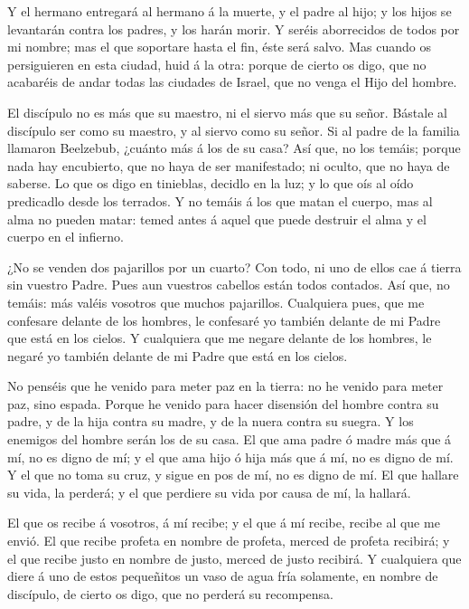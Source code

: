  Y el hermano entregará al hermano á la muerte, y el padre
al hijo; y los hijos se levantarán contra los padres, y los harán morir.
 Y seréis aborrecidos de todos por mi nombre; mas el que
soportare hasta el fin, éste será salvo.  Mas cuando os
persiguieren en esta ciudad, huid á la otra: porque de cierto os digo,
que no acabaréis de andar todas las ciudades de Israel, que no venga el
Hijo del hombre.

 El discípulo no es más que su maestro, ni el siervo más
que su señor.  Bástale al discípulo ser como su maestro, y
al siervo como su señor. Si al padre de la familia llamaron Beelzebub,
¿cuánto más á los de su casa?  Así que, no los temáis;
porque nada hay encubierto, que no haya de ser manifestado; ni oculto,
que no haya de saberse.  Lo que os digo en tinieblas,
decidlo en la luz; y lo que oís al oído predicadlo desde los terrados.
 Y no temáis á los que matan el cuerpo, mas al alma no
pueden matar: temed antes á aquel que puede destruir el alma y el cuerpo
en el infierno.

 ¿No se venden dos pajarillos por un cuarto? Con todo, ni
uno de ellos cae á tierra sin vuestro Padre.  Pues aun
vuestros cabellos están todos contados.  Así que, no
temáis: más valéis vosotros que muchos pajarillos. 
Cualquiera pues, que me confesare delante de los hombres, le confesaré
yo también delante de mi Padre que está en los cielos.  Y
cualquiera que me negare delante de los hombres, le negaré yo también
delante de mi Padre que está en los cielos.

 No penséis que he venido para meter paz en la tierra: no
he venido para meter paz, sino espada.  Porque he venido
para hacer disensión del hombre contra su padre, y de la hija contra su
madre, y de la nuera contra su suegra.  Y los enemigos del
hombre serán los de su casa.  El que ama padre ó madre más
que á mí, no es digno de mí; y el que ama hijo ó hija más que á mí, no
es digno de mí.  Y el que no toma su cruz, y sigue en pos
de mí, no es digno de mí.  El que hallare su vida, la
perderá; y el que perdiere su vida por causa de mí, la hallará.

 El que os recibe á vosotros, á mí recibe; y el que á mí
recibe, recibe al que me envió.  El que recibe profeta en
nombre de profeta, merced de profeta recibirá; y el que recibe justo en
nombre de justo, merced de justo recibirá.  Y cualquiera
que diere á uno de estos pequeñitos un vaso de agua fría solamente, en
nombre de discípulo, de cierto os digo, que no perderá su recompensa.

